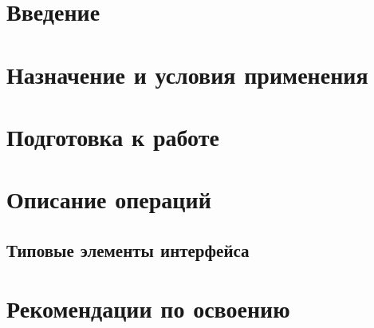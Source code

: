 \documentclass[a4paper,11pt]{report}
\begin{document}
	

\tableofcontents
\clearpage

\chapter{Введение}
	
\chapter{Назначение и условия применения}
	
\chapter{Подготовка к работе}
	
\chapter{Описание операций}
	
	
	\section{Типовые элементы интерфейса}
		
		
	
	
	
	
	
	
	
	
	
\chapter{Рекомендации по освоению}
	
	
\end{document}
